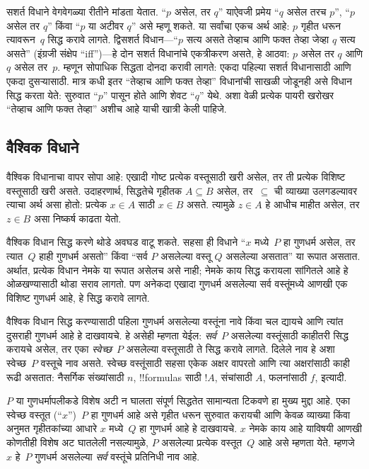 \documentclass[../../../include/open-logic-section]{subfiles}
\begin{document}
सशर्त विधाने वेगवेगळ्या रीतीने मांडता येतात. “$p$ असेल, तर $q$” याऐवजी प्रमेय “$q$ असेल तरच $p$”, “$p$ असेल तर $q$” किंवा “$p$ या अटीवर $q$” असे म्हणू शकते. या सर्वांचा एकच अर्थ आहे: $p$ गृहीत धरून त्यावरून~$q$ सिद्ध करावे लागते. द्विसशर्त विधान---“$p$ सत्य असते तेव्हाच आणि फक्त तेव्हा जेव्हा $q$ सत्य असते” (इंग्रजी संक्षेप “iff”)---हे दोन सशर्त विधानांचे एकत्रीकरण असते, हे आठवा: $p$ असेल तर $q$ आणि $q$ असेल तर~$p$. म्हणून सोपाधिक सिद्धता दोनदा करावी लागते: एकदा पहिल्या सशर्त विधानासाठी आणि एकदा दुसऱ्यासाठी. मात्र कधी इतर “तेव्हाच आणि फक्त तेव्हा” विधानांची साखळी जोडूनही असे विधान सिद्ध करता येते: सुरुवात “$p$” पासून होते आणि शेवट “$q$” येथे. अशा वेळी प्रत्येक पायरी खरोखर “तेव्हाच आणि फक्त तेव्हा” अशीच आहे याची खात्री केली पाहिजे.

\subsection{वैश्विक विधाने}

वैश्विक विधानाचा वापर सोपा आहे: एखादी गोष्ट प्रत्येक वस्तूसाठी खरी असेल, तर ती प्रत्येक विशिष्ट वस्तूसाठी खरी असते. उदाहरणार्थ, सिद्धतेचे गृहीतक $A \subseteq B$ असेल, तर~$\subseteq$ ची व्याख्या उलगडल्यावर त्याचा अर्थ असा होतो: प्रत्येक $x \in A$ साठी $x \in B$ असते. त्यामुळे $z \in A$ हे आधीच माहीत असेल, तर $z \in B$ असा निष्कर्ष काढता येतो.

वैश्विक विधान सिद्ध करणे थोडे अवघड वाटू शकते. सहसा ही विधाने “$x$ मध्ये~$P$ हा गुणधर्म असेल, तर त्यात~$Q$ हाही गुणधर्म असतो” किंवा “सर्व $P$ असलेल्या वस्तू $Q$ असलेल्या असतात” या रूपात असतात. अर्थात, प्रत्येक विधान नेमके या रूपात असेलच असे नाही; नेमके काय सिद्ध करायला सांगितले आहे हे ओळखण्यासाठी थोडा सराव लागतो. पण अनेकदा एखादा गुणधर्म असलेल्या सर्व वस्तूंमध्ये आणखी एक विशिष्ट गुणधर्म आहे, हे सिद्ध करावे लागते.

वैश्विक विधान सिद्ध करण्यासाठी पहिला गुणधर्म असलेल्या वस्तूंना नावे किंवा चल द्यायचे आणि त्यांत दुसराही गुणधर्म आहे हे दाखवायचे. हे असेही म्हणता येईल: \emph{सर्व}~$P$ असलेल्या वस्तूंसाठी काहीतरी सिद्ध करायचे असेल, तर एका \emph{स्वेच्छ}~$P$ असलेल्या वस्तूसाठी ते सिद्ध करावे लागते. दिलेले नाव हे अशा स्वेच्छ~$P$ वस्तूचे नाव असते. स्वेच्छ वस्तूंसाठी सहसा एकेक अक्षर वापरतो आणि त्या अक्षरांसाठी काही रूढी असतात: नैसर्गिक संख्यांसाठी $n$, !!{formula}s साठी $!A$, संचांसाठी $A$, फलनांसाठी $f$, इत्यादी.

$P$ या गुणधर्मापलीकडे विशेष अटी न घालता संपूर्ण सिद्धतेत सामान्यता टिकवणे हा मुख्य मुद्दा आहे. एका स्वेच्छ वस्तूत (“$x$”)~$P$ हा गुणधर्म आहे असे गृहीत धरून सुरुवात करायची आणि केवळ व्याख्या किंवा अनुमत गृहीतकांच्या आधारे $x$ मध्ये~$Q$ हा गुणधर्म आहे हे दाखवायचे. $x$ नेमके काय आहे याविषयी आणखी कोणतीही विशेष अट घातलेली नसल्यामुळे, $P$ असलेल्या प्रत्येक वस्तूत~$Q$ आहे असे म्हणता येते. म्हणजे $x$ हे~$P$ गुणधर्म असलेल्या \emph{सर्व} वस्तूंचे प्रतिनिधी नाव आहे.
\end{document}

